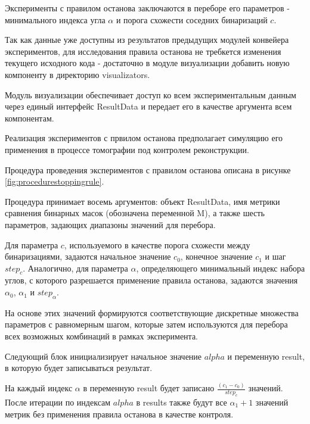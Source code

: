Эксперименты с правилом останова заключаются в переборе его параметров - минимального индекса угла \(\alpha\) и порога схожести соседних бинаризаций \(c\).

Так как данные уже доступны из результатов предыдущих модулей конвейера экспериментов, для исследования правила останова не требкется изменения текущего исходного кода - достаточно в модуле визуализации добавить новую компоненту в директорию visualizators.

Модуль визуализации обеспечивает доступ ко всем экспериментальным данным через единый интерфейс ResultData и передает его в качестве аргумента всем компонентам.

Реализация экспериментов с првилом останова предполагает симуляцию его применения в процессе томографии под контролем реконструкции.

Процедура проведения экспериментов с правилом останова описана в рисунке \ref*{fig:procedurestoppingrule}.


Процедура принимает восемь аргументов: объект ResultData, 
имя метрики сравнения бинарных масок (обозначена переменной M), 
а также шесть параметров, задающих диапазоны значений для перебора.

Для параметра \(c\), используемого в качестве порога схожести между бинаризациями, задаются начальное значение \(c_0\), конечное значение \(c_1\) и шаг \(step_c\). Аналогично, для параметра \(\alpha\), определяющего минимальный индекс набора углов, с которого разрешается применение правила останова, задаются значения \(\alpha_0\), \(\alpha_1\) и \(step_{\alpha}\).

На основе этих значений формируются соответствующие дискретные множества параметров с равномерным шагом, которые затем используются для перебора всех возможных комбинаций в рамках эксперимента.

Следующий блок инициализирует начальное значение \(alpha\) и переменную result, в которую будет записываться результат. 

На каждый индекс \(\alpha\) в переменную result будет записано \(\frac{(c_1 - c_0)}{ step_c}\) значений. После итерации по индексам \(alpha\) в results также будут все \(\alpha_1 + 1\) значений метрик без применения правила останова в качестве контроля. 

